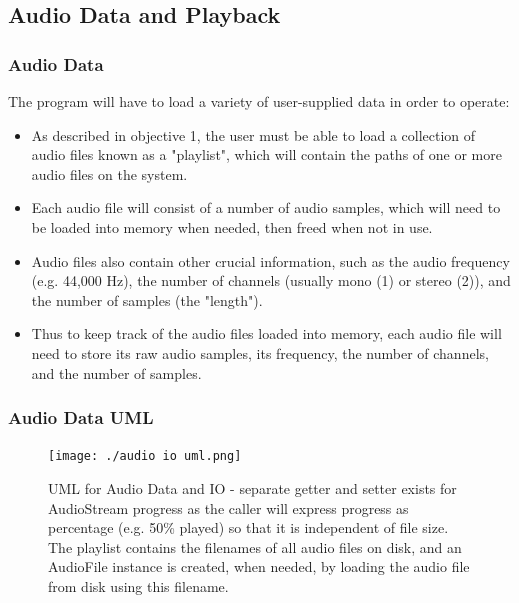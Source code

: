 \pagebreak

\subsection{Audio Data and Playback}

\subsubsection{Audio Data}
The program will have to load a variety of  user-supplied data in order to operate:
\begin{itemize}
	\item As described in objective 1, the user must be able to load a collection of audio files known as  a "playlist", which will contain the paths of one or more audio files on the system.
	\item Each audio file will consist of a number of audio samples, which will need to be loaded into memory when needed, then freed when not in use.
	\item Audio files also contain other crucial information, such as the audio frequency (e.g. 44,000 Hz), the number of channels (usually mono (1) or stereo (2)), and the number of samples (the "length").
	\item Thus to keep track of the audio files loaded into memory, each audio file will need to store its raw audio samples, its frequency, the number of channels, and the number of samples.
\end{itemize}

\subsubsection{ Audio Data UML }
\begin{figure}[H]
	\texttt{[image: ./audio io uml.png]}
	\caption{UML for Audio Data and IO - separate getter and setter exists for AudioStream progress as the caller will express progress as percentage (e.g. 50\% played) so that it is independent of file size. The playlist contains the filenames of all audio files on disk, and an AudioFile instance is created, when needed, by loading the audio file from disk using this filename. }
\end{figure}

